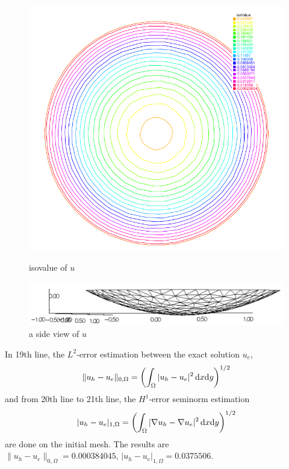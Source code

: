 \documentclass[a4paper,twoside,12pt]{book}
\def\d{\hbox{d}}
\begin{document}
\begin{figure}[htbp]
\begin{minipage}{\textwidth}
\begin{minipage}{0.4\textwidth}
\includegraphics[width=\textwidth]{aTutorial}%
\caption{isovalue of $u$\label{aTutorial}}
\end{minipage}
\hspace{0.5mm}
\begin{minipage}{0.6\textwidth}
\includegraphics[width=\textwidth]{soapfilm3d}%
\caption{a side view of $u$}
\end{minipage}
\end{minipage}
\end{figure}

In 19th line, the $L^2$-error estimation between the exact solution $u_e$,
$$
\|u_h - u_e\|_{0,\Omega}=\left(\int_{\Omega}|u_h-u_e|^2\, \d x\d y\right)^{1/2}
$$
and from 20th line to 21th line, the $H^1$-error seminorm estimation
$$
|u_h - u_e|_{1,\Omega}=\left(\int_{\Omega}|\nabla u_h-\nabla u_e|^2\, \d x\d y\right)^{1/2}
$$
are done on the initial mesh. The results are
$\|u_h - u_e\|_{0,\Omega}=0.000384045,\, |u_h - u_e|_{1,\Omega}=0.0375506$.
\end{document}
